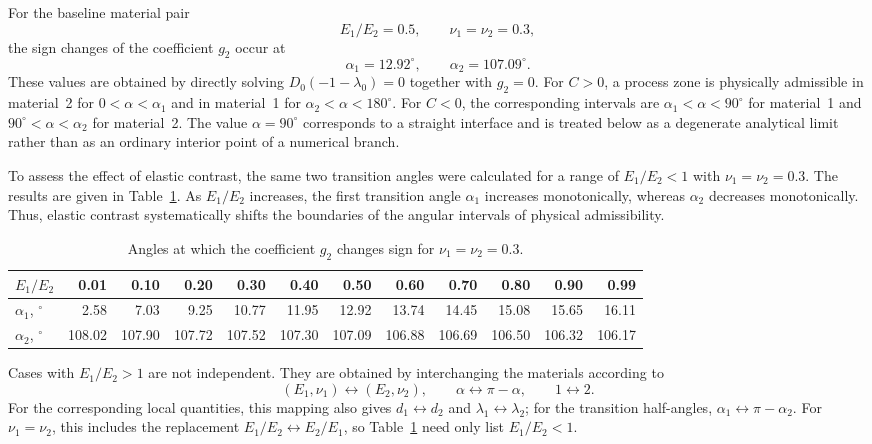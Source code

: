 \documentclass[pdflatex,iicol,sn-mathphys-ay]{sn-jnl}
\begin{document}
For the baseline material pair
\begin{equation*}
  E_1/E_2=0.5,\qquad \nu_1=\nu_2=0.3,
\end{equation*}
the sign changes of the coefficient $g_2$ occur at
\begin{equation*}
  \alpha_1=12.92^\circ,\qquad
  \alpha_2=107.09^\circ.
\end{equation*}
These values are obtained by directly solving
$D_0(-1-\lambda_0)=0$ together with $g_2=0$. For $C>0$, a process zone
is physically admissible in material~2 for $0<\alpha<\alpha_1$ and in
material~1 for $\alpha_2<\alpha<180^\circ$. For $C<0$, the corresponding
intervals are $\alpha_1<\alpha<90^\circ$ for material~1 and
$90^\circ<\alpha<\alpha_2$ for material~2. The value
$\alpha=90^\circ$ corresponds to a straight interface and is treated
below as a degenerate analytical limit rather than as an ordinary
interior point of a numerical branch.

To assess the effect of elastic contrast, the same two transition angles
were calculated for a range of $E_1/E_2<1$ with
$\nu_1=\nu_2=0.3$. The results are given in
Table~\ref{tab:g2-transition-angles}. As $E_1/E_2$ increases, the first
transition angle $\alpha_1$ increases monotonically, whereas $\alpha_2$
decreases monotonically. Thus, elastic contrast systematically shifts
the boundaries of the angular intervals of physical admissibility.

\begin{table}[htbp]
  \centering
  \caption{Angles at which the coefficient $g_2$ changes sign for
  $\nu_1=\nu_2=0.3$.}
  \label{tab:g2-transition-angles}
  \small
  \setlength{\tabcolsep}{4.0pt}
  \begin{tabular}{@{}lrrrrrrrrrrr@{}}
    \toprule
    $E_1/E_2$ & 0.01 & 0.10 & 0.20 & 0.30 & 0.40 & 0.50 & 0.60 & 0.70 & 0.80 & 0.90 & 0.99 \\
    \midrule
    $\alpha_1$, $^\circ$ & 2.58 & 7.03 & 9.25 & 10.77 & 11.95 & 12.92 & 13.74 & 14.45 & 15.08 & 15.65 & 16.11 \\
    $\alpha_2$, $^\circ$ & 108.02 & 107.90 & 107.72 & 107.52 & 107.30 & 107.09 & 106.88 & 106.69 & 106.50 & 106.32 & 106.17 \\
    \bottomrule
  \end{tabular}
\end{table}


Cases with $E_1/E_2>1$ are not independent. They are obtained by
interchanging the materials according to
\begin{equation*}
  (E_1,\nu_1)\leftrightarrow(E_2,\nu_2),
  \qquad
  \alpha\leftrightarrow\pi-\alpha,
  \qquad
  1\leftrightarrow2.
\end{equation*}
For the corresponding local quantities, this mapping also gives
$d_1\leftrightarrow d_2$ and
$\lambda_1\leftrightarrow\lambda_2$; for the transition half-angles,
$\alpha_1\leftrightarrow\pi-\alpha_2$. For $\nu_1=\nu_2$, this
includes the replacement
$E_1/E_2\leftrightarrow E_2/E_1$, so Table~\ref{tab:g2-transition-angles}
need only list $E_1/E_2<1$.
\end{document}
